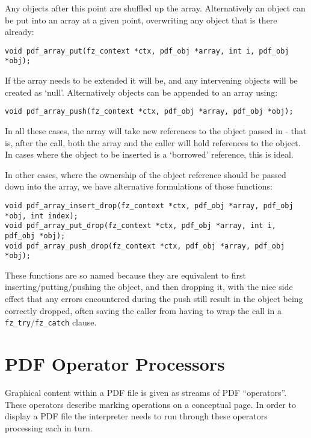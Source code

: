 \documentclass[oneside]{book}
\begin{document}
Any objects after this point are shuffled up the array. Alternatively an object can be put into an array at a given point, overwriting any object that is there already:

\begin{lstlisting}
void pdf_array_put(fz_context *ctx, pdf_obj *array, int i, pdf_obj *obj);
\end{lstlisting}

If the array needs to be extended it will be, and any intervening objects will be created as `null'. Alternatively objects can be appended to an array using:

\begin{lstlisting}
void pdf_array_push(fz_context *ctx, pdf_obj *array, pdf_obj *obj);
\end{lstlisting}

In all these cases, the array will take new references to the object passed in - that is, after the call, both the array and the caller will hold references to the object. In cases where the object to be inserted is a `borrowed' reference, this is ideal.

In other cases, where the ownership of the object reference should be passed down into the array, we have alternative formulations of those functions:

\begin{lstlisting}
void pdf_array_insert_drop(fz_context *ctx, pdf_obj *array, pdf_obj *obj, int index);
void pdf_array_put_drop(fz_context *ctx, pdf_obj *array, int i, pdf_obj *obj);
void pdf_array_push_drop(fz_context *ctx, pdf_obj *array, pdf_obj *obj);
\end{lstlisting}

These functions are so named because they are equivalent to first inserting/putting/pushing the object, and then dropping it, with the nice side effect that any errors encountered during the push still result in the object being correctly dropped, often saving the caller from having to wrap the call in a \texttt{fz\_try}/\texttt{fz\_catch} clause.

\section{PDF Operator Processors}

Graphical content within a PDF file is given as streams of PDF ``operators''. These operators describe marking operations on a conceptual page. In order to display a PDF file the interpreter needs to run through these operators processing each in turn.
\end{document}
